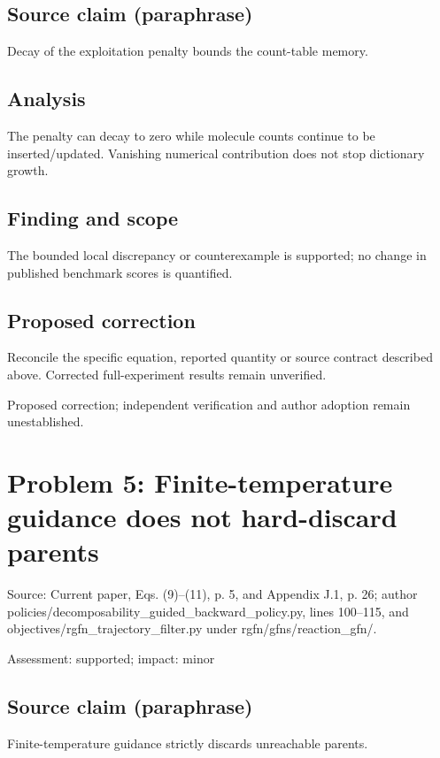 \documentclass[11pt]{article}
\begin{document}
\subsection*{Source claim (paraphrase)}

Decay of the exploitation penalty bounds the count-table memory.

\subsection*{Analysis}

The penalty can decay to zero while molecule counts continue to be inserted/updated. Vanishing numerical contribution does not stop dictionary growth.

\subsection*{Finding and scope}

The bounded local discrepancy or counterexample is supported; no change in published benchmark scores is quantified.

\subsection*{Proposed correction}

Reconcile the specific equation, reported quantity or source contract described above. Corrected full-experiment results remain unverified.

Proposed correction; independent verification and author adoption remain unestablished.

\section*{Problem 5: Finite-temperature guidance does not hard-discard parents}

Source: Current paper, Eqs. (9)–(11), p. 5, and Appendix J.1, p. 26; author policies/decomposability\_guided\_backward\_policy.py, lines 100–115, and objectives/rgfn\_trajectory\_filter.py under rgfn/gfns/reaction\_gfn/.

Assessment: supported; impact: minor

\subsection*{Source claim (paraphrase)}

Finite-temperature guidance strictly discards unreachable parents.
\end{document}
